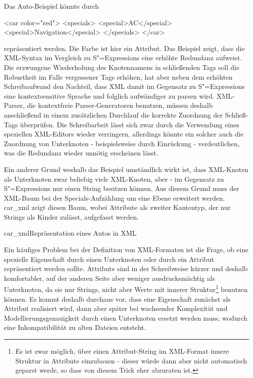\documentclass[11pt, a4paper, bibgerm]{scrbook}
\newcommand\abb{}
\newcommand\fig{}
\newcommand{\sexps}{S"=Expressions}
\begin{document}
Das Auto-Beispiel könnte durch
\begin{code}
<car color="red">
  <specials>
    <special>AC</special>
    <special>Navigation</special>
  </specials>
</car>
\end{code} %
repräsentiert werden. Die Farbe ist hier ein Attribut. Das Beispiel
zeigt, dass die XML-Syntax im Vergleich zu \sexps{} eine erhöhte
Redundanz aufweist. Die erzwungene Wiederholung des Knotennamens in
schließenden Tags soll die Robustheit im Falle vergessener Tags erhöhen,
hat aber neben dem erhöhten Schreibaufwand den Nachteil, dass XML damit
im Gegensatz zu \sexps{} eine kontextsensitive Sprache und folglich
aufwändiger zu parsen wird. XML-Parser, die kontextfreie
Parser-Generatoren benutzen, müssen deshalb anschließend in einem
zusätzlichen Durchlauf die korrekte Zuordnung der Schließ-Tags
überprüfen. Die Schreibarbeit lässt sich zwar durch die Verwendung eines
speziellen XML-Editors wieder verringern, allerdings könnte ein solcher
auch die Zuordnung von Unterknoten - beispielsweise durch Einrückung -
verdeutlichen, was die Redundanz wieder unnötig erscheinen lässt.

Ein anderer Grund weshalb das Beispiel umständlich wirkt ist, dass
XML-Knoten als Unterknoten zwar beliebig viele XML-Knoten, aber - im
Gegensatz zu \sexps{} nur einen String besitzen können. Aus diesem Grund
muss der XML-Baum bei der Specials-Aufzählung um eine Ebene erweitert
werden. \abb{car_xml} zeigt diesen Baum, wobei Attribute als zweiter
Kantentyp, der nur Strings als Kinder zulässt, aufgefasst werden.

\fig{car_xml}{Repräsentation eines Autos in XML}

Ein häufiges Problem bei der Definition von XML-Formaten ist die
Frage, ob eine spezielle Eigenschaft durch einen Unterknoten oder
durch ein Attribut repräsentiert werden sollte. Attribute sind in der
Schreibweise kürzer und deshalb komfortabler, auf der anderen Seite
aber weniger ausdrucksmächtig als Unterknoten, da sie nur Strings,
nicht aber Werte mit innerer Struktur\footnote{Es ist zwar möglich,
  über einen Attribut-String im XML-Format innere Struktur in
  Attribute einzubauen - dieser würde dann aber nicht automatisch
  geparst werde, so dass von diesem Trick eher abzuraten ist.}
benutzen können. Es kommt deshalb durchaus vor, dass eine Eigenschaft
zunächst als Attribut realisiert wird, dann aber später bei wachsender
Komplexität und Modellierungsgenauigkeit durch einen Unterknoten
ersetzt werden muss, wodurch eine Inkompatibilität zu alten Dateien
entsteht.
\end{document}
